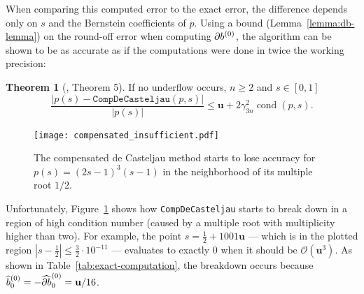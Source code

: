 \documentclass[3p, authoryear, square]{elsarticle}
\theoremstyle{definition}
\newtheorem{theorem}{Theorem}[section]
\newcommand{\cond}[1]{\operatorname{cond}\left(#1\right)}
\newcommand{\bigO}[1]{\mathcal{O}\left(#1\right)}
\newcommand{\mach}{\mathbf{u}}
\newcommand{\db}[1]{
  \ifthenelse{\equal{#1}{1}}
             {\partial b}
             {\partial^{#1} b}
}
\newcommand{\cdb}[1]{
  \ifthenelse{\equal{#1}{1}}
             {\widehat{\partial b}}
             {\widehat{\partial^{#1} b}}
}
\begin{document}
\noindent  When comparing this computed error to the exact error, the
difference depends only on \(s\) and the Bernstein
coefficients of \(p\). Using a bound (Lemma~\ref{lemma:db-lemma}) on the
round-off error when computing \(\db{1}^{(0)}\), the algorithm can
be shown to be as accurate as if the computations were done in twice
the working precision:

\begin{theorem}[\cite{Jiang2010}, Theorem 5]
  If no underflow occurs, \(n \geq 2\) and \(s \in \left[0, 1\right]\)
  \begin{equation}
    \frac{\left|p(s) - \mathtt{CompDeCasteljau}(p, s)\right|}{
      \left|p(s)\right|} \leq \mach + 2 \gamma_{3n}^2 \cond{p, s}.
  \end{equation}
\end{theorem}

\begin{figure}
  \texttt{[image: compensated\_insufficient.pdf]}
  \centering
  \captionsetup{width=.75\linewidth}
  \caption{The compensated de Casteljau method starts to lose accuracy
    for \(p(s) = (2s - 1)^3 (s - 1)\) in the neighborhood of its
    multiple root \(1/2\).}
  \label{fig:compensated-insufficient}
\end{figure}

Unfortunately, Figure~\ref{fig:compensated-insufficient} shows how
\texttt{CompDeCasteljau} starts to break down in a region of
high condition number (caused by a multiple root with multiplicity
higher than two). For example, the point
\(s = \frac{1}{2} + 1001\mach\)
--- which is in the plotted region \(\left|s - \frac{1}{2}\right|
\leq \frac{3}{2} \cdot 10^{-11}\) --- evaluates to exactly \(0\) when
it should be \(\bigO{\mach^3}\). As shown in
Table~\ref{tab:exact-computation}, the breakdown occurs because
\(\widehat{b}_0^{(0)} = -\cdb{1}_0^{(0)} = \mach / 16\).
\end{document}

